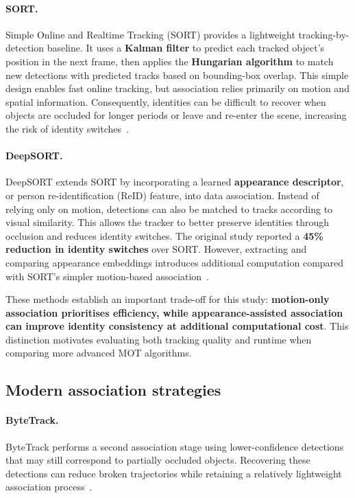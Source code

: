 \documentclass[11pt,a4paper]{article}
\begin{document}
\paragraph{SORT.} Simple Online and Realtime Tracking (SORT) provides a lightweight tracking-by-detection baseline. It uses a \textbf{Kalman filter} to predict each tracked object's position in the next frame, then applies the \textbf{Hungarian algorithm} to match new detections with predicted tracks based on bounding-box overlap. This simple design enables fast online tracking, but association relies primarily on motion and spatial information. Consequently, identities can be difficult to recover when objects are occluded for longer periods or leave and re-enter the scene, increasing the risk of identity switches~\cite{bewley2016sort}.

\paragraph{DeepSORT.} DeepSORT extends SORT by incorporating a learned \textbf{appearance descriptor}, or person re-identification (ReID) feature, into data association. Instead of relying only on motion, detections can also be matched to tracks according to visual similarity. This allows the tracker to better preserve identities through occlusion and reduces identity switches. The original study reported a \textbf{45\% reduction in identity switches} over SORT. However, extracting and comparing appearance embeddings introduces additional computation compared with SORT's simpler motion-based association~\cite{wojke2017deepsort}.

These methods establish an important trade-off for this study: \textbf{motion-only association prioritises efficiency, while appearance-assisted association can improve identity consistency at additional computational cost}. This distinction motivates evaluating both tracking quality and runtime when comparing more advanced MOT algorithms.

\subsection{Modern association strategies}

\paragraph{ByteTrack.} ByteTrack performs a second association stage using lower-confidence detections that may still correspond to partially occluded objects. Recovering these detections can reduce broken trajectories while retaining a relatively lightweight association process~\cite{zhang2022bytetrack}.
\end{document}

